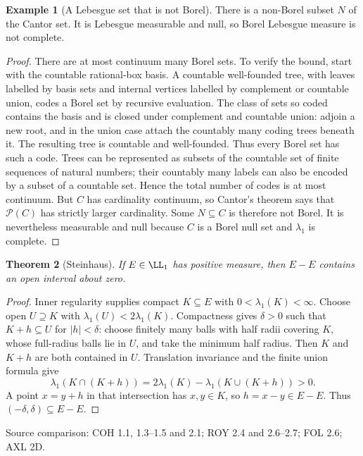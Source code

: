 \documentclass[11pt,oneside,openany]{book}
\newtheorem{theorem}{Theorem}[chapter]
\theoremstyle{definition}
\newtheorem{example}[theorem]{Example}
\theoremstyle{remark}
\newcommand{\family}[1]{}
\newcommand{\source}[1]{\par\begingroup\small\sffamily\color{black!65}Source comparison: #1\par\endgroup}
\begin{document}
\begin{example}[A Lebesgue set that is not Borel]
\family{D11.03.lebesgue_not_borel}\label{d11:03:lebesgue-not-borel}
There is a non-Borel subset $N$ of the Cantor set. It is Lebesgue measurable
and null, so Borel Lebesgue measure is not complete.
\end{example}
\begin{proof}
There are at most continuum many Borel sets. To verify the bound, start with
the countable rational-box basis. A countable well-founded tree, with leaves
labelled by basis sets and internal vertices labelled by complement or
countable union, codes a Borel set by recursive evaluation. The class of
sets so coded contains the basis and is closed under complement and
countable union: adjoin a new root, and in the union case attach the countably
many coding trees beneath it. The resulting tree is countable and
well-founded. Thus every Borel set has such a code. Trees can be represented
as subsets of the countable set of finite sequences of natural numbers;
their countably many labels can also be encoded by a subset of a countable
set. Hence the total number of codes is at most continuum.
But $C$ has cardinality continuum, so Cantor's theorem says that
$\mathcal P(C)$ has strictly larger cardinality. Some $N\subseteq C$ is
therefore not Borel. It is nevertheless measurable and null because $C$ is
a Borel null set and $\lambda_1$ is complete.
\end{proof}

\begin{theorem}[Steinhaus]
\family{D11.03.steinhaus}\label{d11:03:steinhaus}
If $E\in\LL_1$ has positive measure, then $E-E$ contains an open interval
about zero.
\end{theorem}
\begin{proof}
Inner regularity supplies compact $K\subseteq E$ with
$0<\lambda_1(K)<\infty$. Choose open $U\supseteq K$ with
$\lambda_1(U)<2\lambda_1(K)$. Compactness gives $\delta>0$ such that
$K+h\subseteq U$ for $|h|<\delta$: choose finitely many balls with half
radii covering $K$, whose full-radius balls lie in $U$, and take the minimum
half radius. Then $K$ and $K+h$ are both contained in $U$. Translation
invariance and the finite union formula give
\[
 \lambda_1(K\cap(K+h))=2\lambda_1(K)-\lambda_1(K\cup(K+h))>0.
\]
A point $x=y+h$ in that intersection has $x,y\in K$, so $h=x-y\in E-E$.
Thus $(-\delta,\delta)\subseteq E-E$.
\end{proof}
\source{COH 1.1, 1.3--1.5 and 2.1; ROY 2.4 and 2.6--2.7; FOL 2.6; AXL 2D.}
\end{document}
